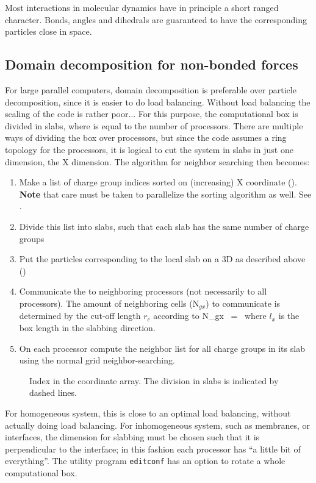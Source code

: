 Most interactions in molecular dynamics have in principle a short ranged character.
Bonds, angles and dihedrals are guaranteed to have the corresponding particles 
close in space.


\subsection{Domain decomposition for non-bonded forces}
For large parallel computers, domain decomposition is preferable over particle
decomposition, since it is easier to do load balancing. Without load balancing
the scaling of the code is rather poor...
For this purpose, the computational box is divided in {\nproc} slabs, where {\nproc}
is equal to the number of processors. There are multiple ways of dividing the box
over processors, but since the {\gromacs} code assumes
a ring topology for the processors, it is logical to cut the system in slabs in
just one dimension, the X dimension. 
The algorithm for neighbor searching then becomes:
\begin{enumerate}
\item	Make a list of charge group indices sorted on (increasing) X coordinate
	().
	{\bf Note} that care must be taken to parallelize the sorting algorithm
	as well. See .
\item	Divide this list into slabs, such that each slab has the same number of
	charge groups
\item	Put the particles corresponding to the local slab on a 3D {\nsgrid} as 
	described above ()
\item	Communicate the {\nsgrid} to neighboring processors (not necessarily to all
	processors). The amount of neighboring {\nsgrid} cells (N$_{gx}$) to 
	communicate is determined by the cut-off length $r_c$ according to
	\beq
	N_{gx}	~=~	   
	\eeq
	where $l_x$ is the box length in the slabbing direction. 
\item	On each processor compute the neighbor list for all charge groups in
	its slab using the normal grid neighbor-searching.
\end{enumerate}

\begin{figure}
\centerline{}
\caption{Index in the coordinate array. The division in slabs is indicated by dashed lines.}
\label{fig:parsort}
\end{figure}

For homogeneous system, this is close to an optimal load balancing,
without actually doing load balancing. For inhomogeneous system, such
as membranes, or interfaces, the dimension for slabbing must be chosen
such that it is perpendicular to the interface; in this fashion each
processor has ``a little bit of everything''.  The {\gromacs} utility
program {\tt editconf} has an option to rotate a whole
computational box.

